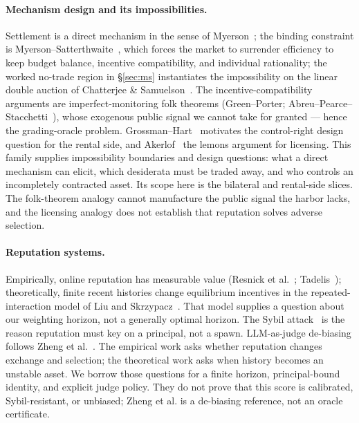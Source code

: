 \documentclass[11pt,a4paper]{article}
\theoremstyle{definition}
\theoremstyle{definition}
\theoremstyle{remark}
\begin{document}
\paragraph{Mechanism design and its impossibilities.} Settlement is a direct
mechanism in the sense of Myerson~; the binding constraint is
Myerson--Satterthwaite~, which forces the market to surrender
efficiency to keep budget balance, incentive compatibility, and individual
rationality; the worked no-trade region in \S\ref{sec:ms} instantiates the
impossibility on the linear double auction of Chatterjee \&
Samuelson~. The incentive-compatibility arguments are imperfect-monitoring folk
theorems (Green--Porter; Abreu--Pearce--Stacchetti~), whose exogenous
public signal we cannot take for granted --- hence the grading-oracle problem.
Grossman--Hart~ motivates the control-right design question for
the rental side, and Akerlof~ the lemons argument for licensing.
This family supplies impossibility boundaries and design questions: what a
direct mechanism can elicit, which desiderata must be traded away, and who
controls an incompletely contracted asset. Its scope here is the bilateral and
rental-side slices. The folk-theorem analogy cannot manufacture the public
signal the harbor lacks, and the licensing analogy does not establish that
reputation solves adverse selection.

\paragraph{Reputation systems.} Empirically, online reputation has measurable value
(Resnick et al.~; Tadelis~); theoretically,
finite recent histories change equilibrium incentives in the repeated-interaction
model of Liu and Skrzypacz~. That model supplies a question about
our weighting horizon, not a generally optimal horizon. The Sybil
attack~ is the reason reputation must key on a principal, not a
spawn. LLM-as-judge de-biasing follows Zheng et al.~.
The empirical work asks whether reputation changes exchange and selection; the
theoretical work asks when history becomes an unstable asset. We borrow those
questions for a finite horizon, principal-bound identity, and explicit judge
policy. They do not prove that this score is calibrated, Sybil-resistant, or
unbiased; Zheng et al. is a de-biasing reference, not an oracle certificate.
\end{document}
